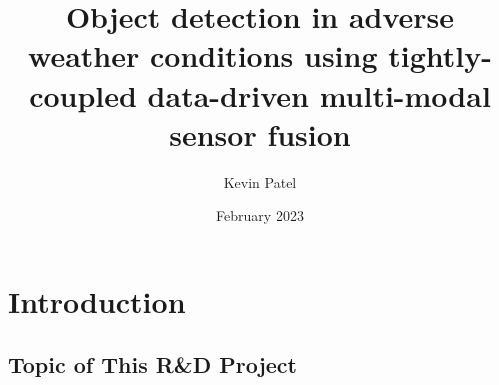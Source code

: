 \documentclass[rnd]{mas_proposal}
\title{Object detection in adverse weather conditions using tightly-coupled data-driven multi-modal sensor fusion}
\author{Kevin Patel}
\date{February 2023}
\begin{document}
\maketitle

\pagestyle{plain}

\section{Introduction}

\subsection{Topic of This R\&D Project}
\begin{itemize}
    





\end{itemize}
\end{document}
